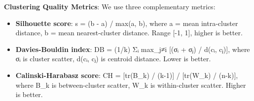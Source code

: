 \documentclass[
  letterpaper,
  DIV=11,
  numbers=noendperiod]{scrartcl}
\begin{document}
\textbf{Clustering Quality Metrics}: We use three complementary metrics:

\begin{itemize}
\item
  \textbf{Silhouette score}: s = (b - a) / max(a, b), where a = mean
  intra-cluster distance, b = mean nearest-cluster distance. Range
  {[}-1, 1{]}, higher is better.
\item
  \textbf{Davies-Bouldin index}: DB = (1/k) Σᵢ max\_j≠i {[}(σᵢ + σⱼ) /
  d(cᵢ, cⱼ){]}, where σᵢ is cluster scatter, d(cᵢ, cⱼ) is centroid
  distance. Lower is better.
\item
  \textbf{Calinski-Harabasz score}: CH = {[}tr(B\_k) / (k-1){]} /
  {[}tr(W\_k) / (n-k){]}, where B\_k is between-cluster scatter, W\_k is
  within-cluster scatter. Higher is better.
\end{itemize}
\end{document}
